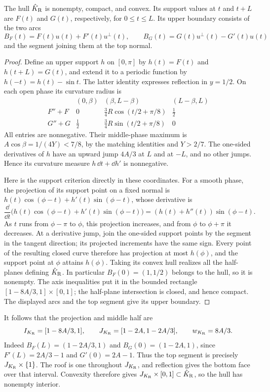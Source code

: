 \begin{lemma}\label{lem:reference-support}
The hull $\hat K_{\mathrm R}$ is nonempty, compact, and convex. Its support values
at $t$ and $t+L$ are $F(t)$ and $G(t)$, respectively, for
$0\le t\le L$. Its upper boundary consists of the two arcs
\[
 B_F(t)=F(t)u(t)+F'(t)u^\perp(t),\qquad
 B_G(t)=G(t)u^\perp(t)-G'(t)u(t)
\]
and the segment joining them at the top normal.
\end{lemma}
\begin{proof}
Define an upper support $h$ on $[0,\pi]$ by
$h(t)=F(t)$ and $h(t+L)=G(t)$, and extend it to a periodic
function by $h(-t)=h(t)-\sin t$. The latter identity expresses
reflection in $y=1/2$. On each open phase its curvature radius is
\[
 \begin{array}{c|ccc}
  & (0,\beta)&(\beta,L-\beta)&(L-\beta,L)\\ \hline
  F''+F&0&\tfrac34R\cos(t/2+\pi/8)&\tfrac12\\
  G''+G&\tfrac12&\tfrac34R\sin(t/2+\pi/8)&0
 \end{array}
\]
All entries are nonnegative. Their middle-phase maximum is
$A\cos\beta=1/(4Y)<7/8$, by the matching identities and $Y>2/7$.
The one-sided derivatives of $h$ have an upward jump $4A/3$ at
$L$ and at $-L$, and no other jumps. Hence its curvature measure
$h\,\dd t+\dd h'$ is nonnegative.

Here is the support criterion directly in these coordinates.
For a smooth phase, the projection of its support point on a fixed
normal is $h(t)\cos(\phi-t)+h'(t)\sin(\phi-t)$, whose derivative is
\[
 \frac{\dd}{\dd t}\bigl(h(t)\cos(\phi-t)
                +h'(t)\sin(\phi-t)\bigr)
       =(h(t)+h''(t))\sin(\phi-t).
\]
As $t$ runs from $\phi-\pi$ to $\phi$, this projection increases,
and from $\phi$ to $\phi+\pi$ it decreases. At a derivative jump,
join the one-sided support points by the segment in the tangent
direction; its projected increments have the same sign. Every
point of the resulting closed curve therefore has projection at
most $h(\phi)$, and the support point at $\phi$ attains $h(\phi)$.
Taking its convex hull realizes all the half-planes defining $\hat K_{\mathrm R}$.
In particular $B_F(0)=(1,1/2)$ belongs to the hull, so it is
nonempty. The axis inequalities put it in the bounded rectangle
$[1-8A/3,1]\times[0,1]$; the half-plane intersection is closed,
and hence compact. The displayed arcs and the top segment give
its upper boundary.
\end{proof}

It follows that the projection and middle half are
\begin{equation}\label{eq:reference-projection}
 I_{K_{\mathrm R}}=[1-8A/3,1],\qquad
 J_{K_{\mathrm R}}=[1-2A,1-2A/3],\qquad w_{K_{\mathrm R}}=8A/3.
\end{equation}
Indeed $B_F(L)=(1-2A/3,1)$ and $B_G(0)=(1-2A,1)$, since
$F'(L)=2A/3-1$ and $G'(0)=2A-1$. Thus the top segment is precisely
$J_{K_{\mathrm R}}\times\{1\}$. The roof is one throughout $J_{K_{\mathrm R}}$,
and reflection gives the bottom face over that interval. Convexity
therefore gives $J_{K_{\mathrm R}}\times[0,1]\subset\hat K_{\mathrm R}$, so the hull has
nonempty interior.

